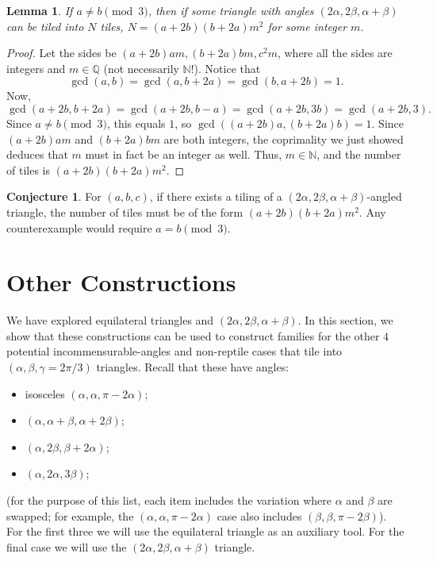 \documentclass{amsart}
\theoremstyle{plain}
\newtheorem{lem}{Lemma}
\theoremstyle{definition}
\newtheorem{conj}{Conjecture}
\begin{document}
\begin{lem}
    \label{lem:squarefree-2} If $a \neq b \pmod{3}$, then if some triangle with angles $(2\alpha, 2\beta, \alpha+\beta)$ can be tiled into $N$ tiles, $N = (a+2b)(b+2a)m^2$ for some integer $m$. 
\end{lem}
\begin{proof}
    Let the sides be $(a+2b)am, (b+2a)bm, c^2m$, where all the sides are integers and $m \in \mathbb{Q}$ (not necessarily $\mathbb{N}$!). Notice that 
    $$\gcd(a, b) = \gcd(a, b+2a) = \gcd(b, a+2b) = 1.$$ 
    Now, $$\gcd(a+2b, b+2a) = \gcd(a+2b, b-a) = \gcd(a+2b, 3b) = \gcd(a+2b, 3).$$
    Since $a \neq b \pmod{3}$, this equals $1$, so $\gcd((a+2b)a, (b+2a)b) = 1$. Since $(a+2b)am$ and $(b+2a)bm$ are both integers, the coprimality we just showed deduces that $m$ must in fact be an integer as well. Thus, $m \in \mathbb{N}$, and the number of tiles is $(a+2b)(b+2a)m^2$.
\end{proof}

\begin{conj}
    For $(a,b,c)$, if there exists a tiling of a $(2\alpha, 2\beta, \alpha+\beta)$-angled triangle, the number of tiles must be of the form $(a+2b)(b+2a)m^2$. Any counterexample would require $a = b \pmod{3}.$
\end{conj}

\section{Other Constructions}
\label{sec:construction}

We have explored equilateral triangles and $(2\alpha, 2\beta, \alpha+\beta)$. In this section, we show that these constructions can be used to construct families for the other $4$ potential incommensurable-angles and non-reptile cases that tile into $(\alpha, \beta, \gamma = 2\pi/3)$ triangles. Recall that these have angles:
\begin{itemize}
    \item isosceles $(\alpha, \alpha, \pi-2\alpha)$; 
    \item $(\alpha, \alpha+\beta, \alpha+2\beta)$;
    \item $(\alpha, 2\beta, \beta+2\alpha)$;
    \item $(\alpha, 2\alpha, 3\beta)$;
\end{itemize}
(for the purpose of this list, each item includes the variation where $\alpha$ and $\beta$ are swapped; for example, the $(\alpha, \alpha, \pi-2\alpha)$ case also includes $(\beta, \beta, \pi-2\beta)$). For the first three we will use the equilateral triangle as an auxiliary tool. For the final case we will use the $(2\alpha, 2\beta, \alpha+\beta)$ triangle.
\end{document}
